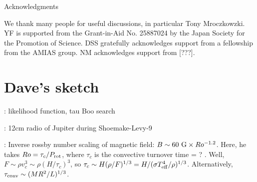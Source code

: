 \documentclass{emulateapj}
\begin{document}
{\sc Acknowledgments}

We thank many people for useful discussions, in particular Tony
Mroczkowzki.  YF is supported from the Grant-in-Aid No. 25887024 by the Japan Society for the Promotion of Science. 
DSS gratefully acknowledges support from a fellowship
from the AMIAS group.  NM acknowledges support from [???].







\clearpage


\section{Dave's sketch}

\citep{spiegel2008}

\citep{lecavelier_et_al2013}

\citep{janhunen_et_al2003}

\citep{zarka1992, zarka1998}

\citep{farrell_et_al2004}

\citep{lazio+farrell2007}: likelihood function, tau Boo search

\citep{lecavelier_et_al2009}

\citep{spiegel2012}

\citep{nordhaus+spiegel2013}



\citep{jiang+jin1996}: 12cm radio of Jupiter during Shoemake-Levy-9

\citep{morin2012, morin_et_al2013}

\citep{christensen_et_al2009, christensen2010}

\citep{saar2001}: Inverse rossby number scaling of magnetic field: $B
\sim 60 {\rm~G} \times Ro^{-1.2}$.  Here, he takes $Ro = \tau_c/P_{\rm
  rot}$, where $\tau_c$ is the convective turnover time = ?
\citep{gilliland1986}.  Well, $F \sim \rho v_c^3 \sim \rho
(H/\tau_c)^3$, so $\tau_c \sim H (\rho / F)^{1/3} = H / (\sigma T_{\rm
  eff}^4 / \rho)^{1/3}$.  Alternatively, $\tau_{\rm conv} \sim (M R^2
/ L)^{1/3}$.
\end{document}
